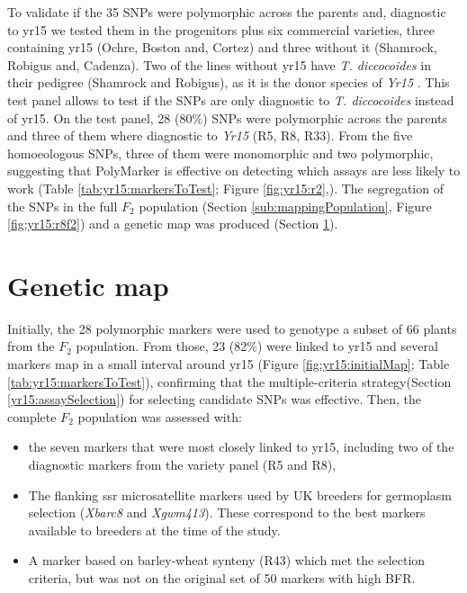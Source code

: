 To validate if the 35 SNPs were polymorphic across the parents and, diagnostic to \acrshort{yr15} we tested them in the progenitors plus six commercial varieties, three containing \acrshort{yr15} (Ochre, Boston and, Cortez) and three without it (Shamrock, Robigus and, Cadenza).
Two of the lines without \acrshort{yr15} have \textit{T. diccocoides} in their pedigree (Shamrock and Robigus), as it is the donor species of \textit{Yr15} \citep{mcintosh1995}. 
This test panel allows to test if the SNPs are only diagnostic to \textit{T. diccocoides} instead of \acrshort{yr15}.
On the test panel, 28 ($80\%$) SNPs were polymorphic across the parents and three of them where diagnostic to \textit{Yr15} (R5, R8, R33).
From the five homoeologous SNPs, three of them were monomorphic and two polymorphic, suggesting that PolyMarker is effective on detecting which assays are less likely to work (Table \ref{tab:yr15:markersToTest}; Figure \ref{fig:yr15:r2},).
The segregation of the SNPs in the full $F_{2}$ population (Section \ref{sub:mappingPopulation}, Figure \ref{fig:yr15:r8f2}) and a genetic map was produced (Section \ref{yr15:geneticMap}).   






\section{Genetic map} 
\label{yr15:geneticMap}


Initially, the 28 polymorphic markers were used to genotype a subset of 66 plants from the $F_{2}$ population. 
From those, 23 (82\%) were linked to \acrshort{yr15} and several markers map in a small interval around \acrshort{yr15} (Figure \ref{fig:yr15:initialMap}; Table \ref{tab:yr15:markersToTest}), confirming that the multiple-criteria strategy(Section \ref{yr15:assaySelection}) for selecting candidate SNPs was effective. 
Then, the complete $F_{2}$ population was assessed with:
\begin{itemize}	
	\item  the seven markers that were most closely linked to \acrshort{yr15}, including two of the diagnostic markers from the variety panel (R5 and R8),
	\item The flanking \acrshort{ssr} microsatellite markers used by UK breeders for germoplasm selection (\textit{Xbarc8} and \textit{Xgwm413}).  These correspond to the best markers available to breeders at the time of the study.
	\item A marker based on barley-wheat synteny (R43) which met the selection criteria, but was not on the original set of 50 markers with high BFR. 
\end{itemize}

